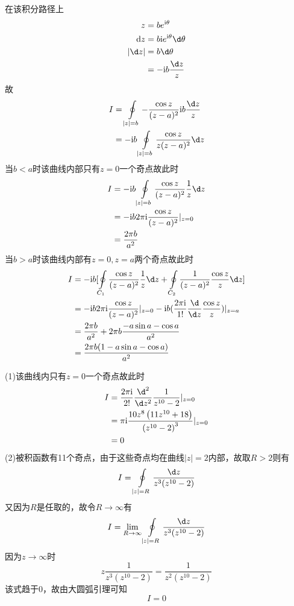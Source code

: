 \documentclass{phyasgn}
\renewcommand{\i}{\mathrm{i}}
\begin{document}
\begin{sol}[3]
  在该积分路径上
  $$\begin{aligned}
    z&=be^{\i\theta}\\
    \mathrm{d} z&=b\i e^{\i\theta}\d \theta\\
    |\d z|&=b\d\theta\\
    &=-\i b\frac{\d z}{z}
  \end{aligned}$$
  故
  $$\begin{aligned}
    I&=\oint\limits_{|z|=b}-\frac{\cos z}{(z-a)^2}\i b\frac{\d z}{z}\\
    &=-\i b\oint\limits_{|z|=b}\frac{\cos z}{z(z-a)^2}\d z\\
  \end{aligned}$$
  当$b<a$时该曲线内部只有$z=0$一个奇点故此时
  $$\begin{aligned}
    I&=-\i b\oint\limits_{|z|=b}\frac{\cos z}{(z-a)^2}\frac{1}{z}\d z\\
    &=-\i b2\pi \i\frac{\cos z}{(z-a)^2}|_{z=0}\\
    &=\frac{2\pi b}{a^2}
  \end{aligned}$$
  当$b>a$时该曲线内部有$z=0,z=a$两个奇点故此时
  $$\begin{aligned}
    I&=-\i b[\oint\limits_{C_1}\frac{\cos z}{(z-a)^2}\frac{1}{z}\d z+\oint\limits_{C_2}\frac{1}{(z-a)^2}\frac{\cos z}{z}\d z]\\
    &=-\i b2\pi \i\frac{\cos z}{(z-a)^2}|_{z=0}-\i b(\frac{2\pi\i}{1!}\frac{\d}{\d z}\frac{\cos z}{z})|_{z=a}\\
    &=\frac{2\pi b}{a^2}+2\pi b\frac{-a\sin a-\cos a}{a^2}\\
    &=\frac{2\pi b(1-a\sin a-\cos a)}{a^2}
  \end{aligned}$$
 \end{sol}\par

\begin{sol}[4]
  (1)该曲线内只有$z=0$一个奇点故此时
  $$\begin{aligned}
    I&=\frac{2\pi\i}{2!}\frac{\d^2}{\d z^2}\frac{1}{z^{10}-2}|_{z=0}\\
    &=\pi \i\frac{10 z^8 \left(11 z^{10}+18\right)}{\left(z^{10}-2\right)^3}|_{z=0}\\
    &=0
  \end{aligned}$$
  (2)被积函数有11个奇点，由于这些奇点均在曲线$|z|=2$内部，故取$R>2$则有
  $$I=\oint\limits_{|z|=R}\frac{\d z}{z^3(z^{10}-2)}$$
  又因为$R$是任取的，故令$R\to\infty$有
  $$I=\lim_{R\to\infty}\oint\limits_{|z|=R}\frac{\d z}{z^3(z^{10}-2)}$$
  因为$z\to\infty$时
  $$z\frac{1}{z^3(z^{10}-2)}=\frac{1}{z^2(z^{10}-2)}$$
  该式趋于0，故由大圆弧引理可知
  $$I=0$$
 \end{sol}\par
\end{document}

